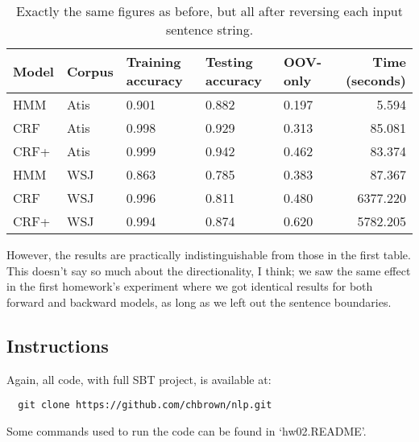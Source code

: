 \documentclass[10pt]{article}\usepackage{graphicx, color}
\begin{document}
\begin{table}[H]
  \centering
  \begin{tabular}{lllllr}
    Model & Corpus & Training accuracy & Testing accuracy & OOV-only & Time (seconds) \\
    \midrule
    HMM   & Atis & 0.901 & 0.882 &
      0.197 & 5.594 \\
    CRF   & Atis & 0.998 & 0.929 &
      0.313 & 85.081 \\
    CRF+ & Atis & 0.999 & 0.942 &
      0.462 & 83.374 \\
    \midrule
    HMM   & WSJ & 0.863 & 0.785 &
      0.383 & 87.367 \\
    CRF   & WSJ & 0.996 & 0.811 &
      0.480 & 6377.220 \\
    CRF+ & WSJ & 0.994 & 0.874 &
      0.620 & 5782.205 \\
  \end{tabular}
  \caption{Exactly the same figures as before, but all after reversing each input sentence string.}
  \label{table:2}
\end{table}
However, the results are practically indistinguishable from those in the first table. This doesn't say so much about the directionality, I think; we saw the same effect in the first homework's experiment where we got identical results for both forward and backward models, as long as we left out the sentence boundaries.

\subsection{Instructions}

Again, all code, with full SBT project, is available at:
\begin{lstlisting}
  git clone https://github.com/chbrown/nlp.git
\end{lstlisting}
Some commands used to run the code can be found in `hw02.README'.
\end{document}
